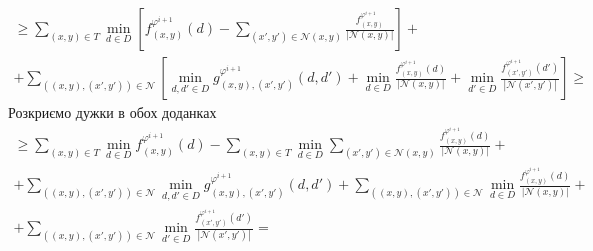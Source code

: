 \begin{equation*}
\begin{gathered}
    \ge \sum \limits_{\left(x, y \right) \in T}
        \min \limits_{d \in D} \left[
            f_{\left(x, y \right)}^{\varphi^{i + 1}} \left( d \right) -
            \sum \limits_{\left(x', y' \right) \in \mathcal{N}\left(x, y \right)}
                \frac{f_{\left(x, y \right)}^{\varphi^{i + 1}}}{\left| \mathcal{N}\left(x, y \right) \right|}
        \right] + \\
    + \sum \limits_{\left(\left(x, y \right), \left(x', y' \right)\right)\in \mathcal{N}}
    \left[
        \min\limits_{d, d' \in D}
            g_{\left(x, y \right),\left(x', y'\right)}^{\varphi^{i + 1}}
                \left(d, d' \right) +
        \min \limits_{d \in D}
            \frac{f_{\left(x, y \right)}^{\varphi^{i + 1}} \left( d \right)}{\left| \mathcal{N}\left(x, y\right)\right|} +
        \min \limits_{d' \in D}
            \frac{f_{\left(x', y' \right)}^{\varphi^{i + 1}} \left( d' \right)}{\left| \mathcal{N}\left(x', y'\right)\right|}
    \right] \ge
\end{gathered}
\end{equation*}
Розкриємо дужки в обох доданках
\begin{equation*}
\begin{gathered}
    \ge \sum \limits_{\left(x, y \right) \in T}
        \min \limits_{d \in D}
            f_{\left(x, y \right)}^{\varphi^{i + 1}}\left( d \right) -
    \sum \limits_{\left(x, y \right) \in T}
        \min \limits_{d \in D}
            \sum \limits_{\left(x', y' \right) \in \mathcal{N} \left(x, y \right)}
                \frac{f_{\left(x, y \right)}^{\varphi^{i + 1}} \left( d \right)}{\left| \mathcal{N}\left(x, y \right) \right|} + \\
    + \sum \limits_{\left(\left(x, y \right), \left(x', y' \right) \right)\in\mathcal{N}}
        \min \limits_{d, d' \in D}
            g_{\left(x, y \right), \left(x', y' \right)}^{\varphi^{i + 1}}
                \left(d, d' \right) +
    \sum \limits_{\left(\left(x, y \right), \left(x', y' \right) \right)\in\mathcal{N}}
        \min \limits_{d \in D}
            \frac{f_{\left(x, y \right)}^{\varphi^{i + 1}} \left( d \right)}{\left| \mathcal{N}\left(x, y\right)\right|} + \\
    + \sum \limits_{\left(\left(x, y \right), \left(x', y' \right) \right)\in\mathcal{N}}
    \min \limits_{d' \in D}
        \frac{f_{\left(x', y' \right)}^{\varphi^{i + 1}} \left( d' \right)}{\left| \mathcal{N}\left(x', y'\right)\right|} =
\end{gathered}
\end{equation*}
